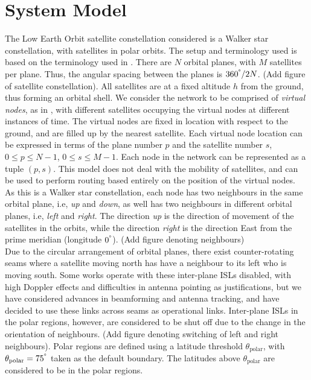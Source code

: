 \documentclass[10pt,conference, draft, letterpaper]{IEEEtran}
\newcommand{\rough}[1]{{\color{red} #1}}
\begin{document}
\section{System Model}
The Low Earth Orbit satellite constellation considered is a Walker star constellation, with satellites in polar orbits. The setup and terminology used is based on the terminology used in \cite{ekici-datagram}. There are $N$ orbital planes, with $M$ satellites per plane. Thus, the angular spacing between the planes is ${360^\degree}/{2N}$. \rough{(Add figure of satellite constellation)}. All satellites are at a fixed altitude $h$ from the ground, thus forming an orbital shell. We consider the network to be comprised of \textit{virtual nodes}, as in \cite{ekici-datagram}, with different satellites occupying the virtual nodes at different instances of time. The virtual nodes are fixed in location with respect to the ground, and are filled up by the nearest satellite. Each virtual node location can be expressed in terms of the plane number $p$ and the satellite number $s$, $0\leq p \leq N-1$, $0\leq s \leq M-1$. Each node in the network can be represented as a tuple $(p,s)$. This model does not deal with the mobility of satellites, and can be used to perform routing based entirely on the position of the virtual nodes. \\
As this is a Walker star constellation, each node has two neighbours in the same orbital plane, i.e, \textit{up} and \textit{down}, as well has two neighbours in different orbital planes, i.e, \textit{left} and \textit{right}. The direction \textit{up} is the direction of movement of the satellites in the orbits, while the direction \textit{right} is the direction East from the prime meridian (longitude $0^\degree$). \rough{(Add figure denoting neighbours)}\\
Due to the circular arrangement of orbital planes, there exist counter-rotating seams where a satellite moving north has have a neighbour to its left who is moving south. Some works operate with these inter-plane ISLs disabled, with high Doppler effects and difficulties in antenna pointing as justifications, but we have considered advances in beamforming and antenna tracking, and have decided to use these links across seams as operational links. Inter-plane ISLs in the polar regions, however, are considered to be shut off due to the change in the orientation of neighbours. \rough{(Add figure denoting switching of left and right neighbours)}. Polar regions are defined using a latitude threshold $\theta_{\text{polar}}$, with $\theta_{\text{polar}} = 75^\degree$ taken as the default boundary. The latitudes above $\theta_{\text{polar}}$ are considered to be in the polar regions.\\
\end{document}
